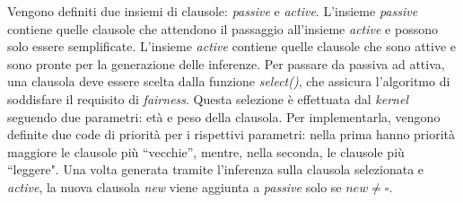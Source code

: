 Vengono definiti due insiemi di clausole: \emph{passive} e \emph{active}.
L'insieme \emph{passive} contiene quelle clausole che attendono il passaggio all'insieme \emph{active} e possono solo essere 
semplificate. L'insieme \emph{active} contiene quelle clausole che sono attive e sono pronte per 
la generazione delle inferenze. Per passare da passiva ad attiva, una clausola deve essere scelta dalla funzione \emph{select()}, 
che assicura l'algoritmo di soddisfare il requisito di \emph{fairness}. Questa selezione è effettuata 
dal \emph{kernel} seguendo due parametri: età e peso della clausola. Per implementarla, vengono definite due code di priorità per i rispettivi parametri:
nella prima hanno priorità maggiore le clausole più ``vecchie'', mentre, nella seconda, le clausole più ``leggere". 
Una volta generata tramite l'inferenza sulla clausola selezionata e \emph{active}, la nuova clausola \emph{new} viene aggiunta a \emph{passive} solo se $new\neq\square$.

